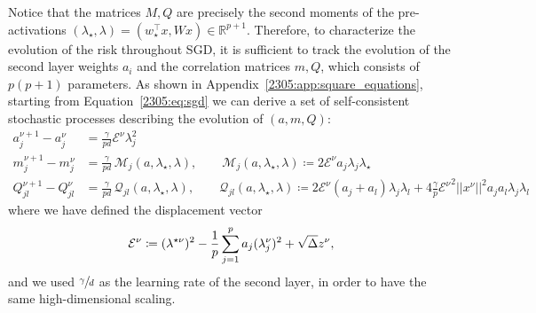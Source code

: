 Notice that the matrices $M, Q$ are precisely the second moments of the pre-activations $(\lambda_{\star},\lambda) = (w_{\star}^{\top}x, Wx)\in\mathbb{R}^{p+1}$. Therefore, to characterize the evolution of the risk throughout SGD, it is sufficient to track the evolution of the second layer weights $a_{i}$ and the correlation matrices $m, Q$, which consists of $p(p+1)$ parameters. As shown in Appendix~\ref{2305:app:square_equations}, starting from Equation~\eqref{2305:eq:sgd} we can derive a set of self-consistent stochastic processes describing the evolution of $(a,m,Q)$:
\begin{align}
\label{2305:eq:def:overlap_process}
    a_{j}^{\nu+1}-a_{j}^{\nu} &= \frac{\gamma}{pd}\mathcal{E}^{\nu}\lambda_{j}^2 \\
    m_{j}^{\nu+1}-m_{j}^{\nu} &= \frac{\gamma}{pd}\,\mathcal M_j(a,\lambda_{\star},\lambda), \qquad \mathcal M_j(a,\lambda_{\star},\lambda)\coloneqq 2\mathcal{E}^{\nu}a_{j}\lambda_{j}\lambda_{\star}\\
    Q_{jl}^{\nu+1} - Q^{\nu}_{jl} &= \frac{\gamma}{pd}\,\mathcal Q_{jl}(a,\lambda_{\star},\lambda), \qquad \mathcal Q_{jl}(a,\lambda_{\star},\lambda)\coloneqq 2\mathcal{E}^{\nu}\left(a_{j}+a_{l}\right)\lambda_{j}\lambda_{l}+4\frac{\gamma}{p}{\mathcal{E}^{\nu}}^{2}||x^{\nu}||^2 a_{j}a_{l}\lambda_{j}\lambda_{l}
\end{align}
where we have defined the displacement vector 
\begin{equation}
\mathcal{E}^{\nu} \coloneqq (\lambda^{\star\nu})^2 - \frac{1}{p}\sum_{j=1}^{p}a_{j}(\lambda_{j}^{\nu})^2 + \sqrt{\Delta} z^{\nu},
\end{equation}
and we used \(\sfrac{\gamma}{d}\) as the learning rate of the second layer, in order to have the same high-dimensional scaling.
